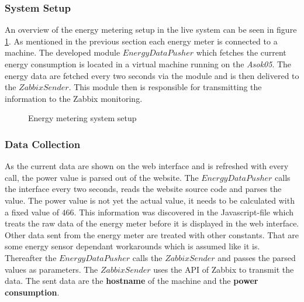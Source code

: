 \subsubsection{System Setup}
An overview of the energy metering setup in the live system can be seen in figure \ref{fig:energyMeteringSetup}. As mentioned in the previous section  each energy meter is connected to a machine. The developed module $ EnergyDataPusher $ which fetches the current energy consumption is located in a virtual machine running on the \textit{Asok05}. The energy data are fetched every two seconds via the module and is then delivered to the $ ZabbixSender $. This module then is responsible for transmitting the information to the Zabbix monitoring.

\begin{figure}
	\centering
	\def\svgwidth{\columnwidth}
	
	\caption{Energy metering system setup}
	\label{fig:energyMeteringSetup}
\end{figure}

\subsubsection{Data Collection}
As the current data are shown on the web interface and is refreshed with every call, the power value is parsed out of the website. The $ EnergyDataPusher $ calls the interface every two seconds, reads the website source code and parses the value. The power value is not yet the actual value, it needs to be calculated with a fixed value of $ 466 $. This information was discovered in the Javascript-file which treats the raw data of the energy meter before it is displayed in the web interface. Other data sent from the energy meter are treated with other constants. That are some energy sensor dependant workarounds which is assumed like it is. Thereafter the $ EnergyDataPusher $ calls the $ ZabbixSender $ and passes the parsed values as parameters. The $ ZabbixSender $ uses the API of Zabbix to transmit the data. The sent data are the \textbf{hostname} of the machine and the \textbf{power consumption}.

